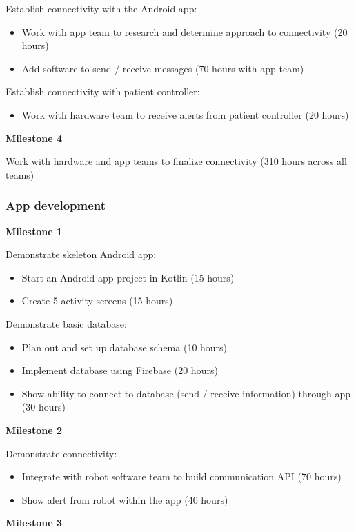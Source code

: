 \documentclass{article}
\begin{document}
Establish connectivity with the Android app:
\begin{itemize}
\item Work with app team to research and determine approach to connectivity (20 hours)
\item Add software to send / receive messages (70 hours with app team)
\end{itemize}

Establish connectivity with patient controller:
\begin{itemize}
\item Work with hardware team to receive alerts from patient controller (20 hours)
\end{itemize}

{\bf Milestone 4}

Work with hardware and app teams to finalize connectivity (310 hours across all teams)


\subsubsection{App development}

{\bf Milestone 1}

Demonstrate skeleton Android app:
\begin{itemize}
\item Start an Android app project in Kotlin (15 hours)
\item Create 5 activity screens (15 hours)
\end{itemize}

Demonstrate basic database:
\begin{itemize}
\item Plan out and set up database schema (10 hours)
\item Implement database using Firebase (20 hours)
\item Show ability to connect to database (send / receive information) through app (30 hours)
\end{itemize}

{\bf Milestone 2}

Demonstrate connectivity:
\begin{itemize}
\item Integrate with robot software team to build communication API (70 hours)
\item Show alert from robot within the app (40 hours)
\end{itemize}

{\bf Milestone 3}
\end{document}
